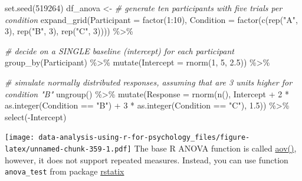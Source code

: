 \documentclass[
]{book}
\newenvironment{Shaded}{\begin{snugshade}}{\end{snugshade}}
\newcommand{\AttributeTok}[1]{\textcolor[rgb]{0.77,0.63,0.00}{#1}}
\newcommand{\CommentTok}[1]{\textcolor[rgb]{0.56,0.35,0.01}{\textit{#1}}}
\newcommand{\DecValTok}[1]{\textcolor[rgb]{0.00,0.00,0.81}{#1}}
\newcommand{\FloatTok}[1]{\textcolor[rgb]{0.00,0.00,0.81}{#1}}
\newcommand{\FunctionTok}[1]{\textcolor[rgb]{0.00,0.00,0.00}{#1}}
\newcommand{\NormalTok}[1]{#1}
\newcommand{\OtherTok}[1]{\textcolor[rgb]{0.56,0.35,0.01}{#1}}
\newcommand{\SpecialCharTok}[1]{\textcolor[rgb]{0.00,0.00,0.00}{#1}}
\newcommand{\StringTok}[1]{\textcolor[rgb]{0.31,0.60,0.02}{#1}}
\begin{document}
\begin{Shaded}
\begin{Highlighting}[]
\FunctionTok{set.seed}\NormalTok{(}\DecValTok{519264}\NormalTok{)}
\NormalTok{df\_anova }\OtherTok{\textless{}{-}}
  \CommentTok{\# generate ten participants with five trials per condition}
  \FunctionTok{expand\_grid}\NormalTok{(}\AttributeTok{Participant  =} \FunctionTok{factor}\NormalTok{(}\DecValTok{1}\SpecialCharTok{:}\DecValTok{10}\NormalTok{),}
              \AttributeTok{Condition =} \FunctionTok{factor}\NormalTok{(}\FunctionTok{c}\NormalTok{(}\FunctionTok{rep}\NormalTok{(}\StringTok{"A"}\NormalTok{, }\DecValTok{3}\NormalTok{), }\FunctionTok{rep}\NormalTok{(}\StringTok{"B"}\NormalTok{, }\DecValTok{3}\NormalTok{), }\FunctionTok{rep}\NormalTok{(}\StringTok{"C"}\NormalTok{, }\DecValTok{3}\NormalTok{)))) }\SpecialCharTok{\%\textgreater{}\%}
  
  \CommentTok{\# decide on a SINGLE baseline (intercept) for each participant}
  \FunctionTok{group\_by}\NormalTok{(Participant) }\SpecialCharTok{\%\textgreater{}\%}
  \FunctionTok{mutate}\NormalTok{(}\AttributeTok{Intercept =} \FunctionTok{rnorm}\NormalTok{(}\DecValTok{1}\NormalTok{, }\DecValTok{5}\NormalTok{, }\FloatTok{2.5}\NormalTok{)) }\SpecialCharTok{\%\textgreater{}\%}
  
  \CommentTok{\# simulate normally distributed responses, assuming that are 3 units higher for condition "B"}
  \FunctionTok{ungroup}\NormalTok{() }\SpecialCharTok{\%\textgreater{}\%}
  \FunctionTok{mutate}\NormalTok{(}\AttributeTok{Response =} \FunctionTok{rnorm}\NormalTok{(}\FunctionTok{n}\NormalTok{(), Intercept }\SpecialCharTok{+} \DecValTok{2} \SpecialCharTok{*} \FunctionTok{as.integer}\NormalTok{(Condition }\SpecialCharTok{==} \StringTok{"B"}\NormalTok{) }\SpecialCharTok{+} \DecValTok{3} \SpecialCharTok{*} \FunctionTok{as.integer}\NormalTok{(Condition }\SpecialCharTok{==} \StringTok{"C"}\NormalTok{), }\FloatTok{1.5}\NormalTok{)) }\SpecialCharTok{\%\textgreater{}\%}
  \FunctionTok{select}\NormalTok{(}\SpecialCharTok{{-}}\NormalTok{Intercept)}
\end{Highlighting}
\end{Shaded}

\texttt{[image: data-analysis-using-r-for-psychology\_files/figure-latex/unnamed-chunk-359-1.pdf]}
The base R ANOVA function is called \href{https://stat.ethz.ch/R-manual/R-devel/library/stats/html/aov.html}{aov()}, however, it does not support repeated measures. Instead, you can use function \texttt{anova\_test} from package \href{https://github.com/kassambara/rstatix}{rstatix}
\end{document}
